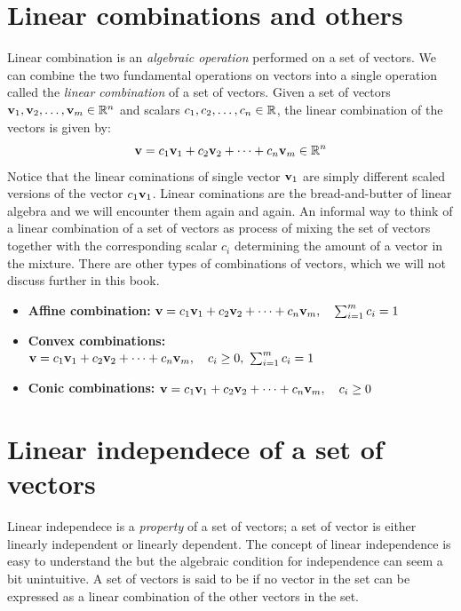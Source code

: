 \section{Linear combinations and others}
Linear combination is an \textit{algebraic operation} performed on a set of vectors. We can combine the two fundamental operations on vectors into a single operation called the \textit{linear combination} of a set of vectors. Given a set of vectors $\mathbf{v}_1, \mathbf{v}_2, \ldots, \mathbf{v}_m \in \mathbb{R}^n$ and scalars $c_1, c_2, \ldots, c_n \in \mathbb{R}$, the linear combination of the vectors is given by:
\begin{equation}
    \mathbf{v} = c_1 \mathbf{v}_1 + c_2 \mathbf{v}_2 + \cdots + c_n \mathbf{v}_m \in \mathbb{R}^n
    \label{eq:linear-comb}
\end{equation}
Notice that the linear cominations of single vector $\mathbf{v}_1$ are simply different scaled versions of the vector $c_1 \mathbf{v}_1$. Linear cominations are the bread-and-butter of linear algebra and we will encounter them again and again. An informal way to think of a linear combination of a set of vectors as process of mixing the set of vectors together with the corresponding scalar $c_i$ determining the amount of a vector in the mixture. There are other types of combinations of vectors, which we will not discuss further in this book.
\begin{itemize}
    \item \textbf{Affine combination:} $\mathbf{v} = c_1 \mathbf{v}_1 + c_2 \mathbf{v}_2 + \cdots + c_n \mathbf{v}_m, \quad \sum_{i=1}^{m} c_i = 1$
    \item \textbf{Convex combinations:} $\mathbf{v} = c_1 \mathbf{v}_1 + c_2 \mathbf{v}_2 + \cdots + c_n \mathbf{v}_m, \quad c_i \geq 0, \,\, \sum_{i=1}^{m} c_i = 1$
    \item \textbf{Conic combinations:} $\mathbf{v} = c_1 \mathbf{v}_1 + c_2 \mathbf{v}_2 + \cdots + c_n \mathbf{v}_m, \quad c_i \geq 0$
\end{itemize}

\section{Linear independece of a set of vectors}
Linear independece is a \textit{property} of a set of vectors; a set of vector is either linearly independent or linearly dependent. The concept of linear independence is easy to understand the but the algebraic condition for independence can seem a bit unintuitive. A set of vectors is said to be  if no vector in the set can be expressed as a linear combination of the other vectors in the set. 

